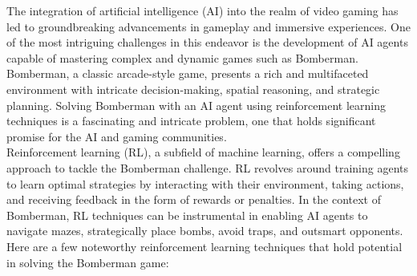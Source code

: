 The integration of artificial intelligence (AI) into the realm of video gaming has led to groundbreaking advancements 
in gameplay and immersive experiences. One of the most intriguing challenges in this endeavor is the development of AI 
agents capable of mastering complex and dynamic games such as Bomberman. Bomberman, a classic arcade-style game, 
presents a rich and multifaceted environment with intricate decision-making, spatial reasoning, and strategic planning. 
Solving Bomberman with an AI agent using reinforcement learning techniques is a fascinating and intricate problem, one 
that holds significant promise for the AI and gaming communities.\\

\noindent Reinforcement learning (RL), a subfield of machine learning, offers a compelling approach to tackle 
the Bomberman challenge. RL revolves around training agents to learn optimal strategies by interacting with their 
environment, taking actions, and receiving feedback in the form of rewards or penalties. In the context of Bomberman, 
RL techniques can be instrumental in enabling AI agents to navigate mazes, strategically place bombs, avoid traps, and 
outsmart opponents. Here are a few noteworthy reinforcement learning techniques that hold potential in solving the Bomberman game:

